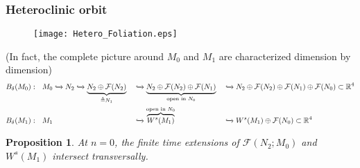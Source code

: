 \documentclass{beamer}
\newtheorem{proposition}{Proposition}
\begin{document}
\begin{frame}
\frametitle{Heteroclinic orbit}
 \begin{figure}
  \texttt{[image: Hetero\_Foliation.eps]}
 \end{figure}
{ \tiny
(In fact, the complete picture around $M_0$ and $M_1$ are characterized dimension by dimension)
\begin{align*}
 B_\delta(M_0): ~~ M_0&\xhookrightarrow{} N_2\xhookrightarrow{} \underbrace{N_2\oplus \mathcal{F}(N_2)}_{\triangleq N_1} &&\xhookrightarrow{} \underbrace{N_2\oplus \mathcal{F}(N_2)\oplus \mathcal{F}(N_1)}_{\text{open in } N_0} &&\xhookrightarrow{} N_2\oplus \mathcal{F}(N_2)\oplus \mathcal{F}(N_1) \oplus \mathcal{F}(N_0)\subset \mathbb{R}^4\\
 B_\delta(M_1): ~~ M_1& & &\xhookrightarrow{} \overbrace{W^s(M_1)}^{\text{open in } N_0}&&\xhookrightarrow{} W^s(M_1)\oplus \mathcal{F}(N_0)\subset \mathbb{R}^4
\end{align*}
}

\begin{proposition}
 At $n=0$, the finite time extensions of $\mathcal{F}(N_2;M_0)$ and $W^{s}(M_1)$ intersect transversally.
\end{proposition} 
 
\end{frame}
\end{document}
